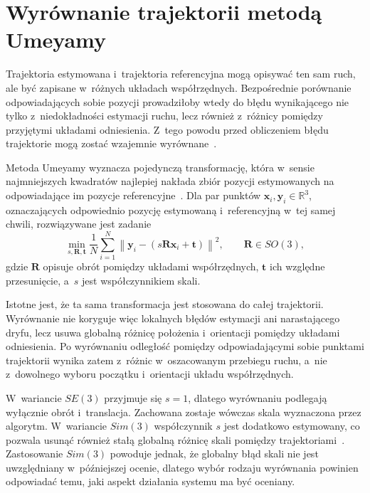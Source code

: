 \section{Wyrównanie trajektorii metodą Umeyamy}
\label{subsec:wyrownanie_umeyamy}

Trajektoria estymowana i~trajektoria referencyjna mogą opisywać ten sam ruch, ale być zapisane w~różnych układach współrzędnych. Bezpośrednie porównanie odpowiadających sobie pozycji prowadziłoby wtedy do błędu wynikającego nie tylko z~niedokładności estymacji ruchu, lecz również z~różnicy pomiędzy przyjętymi układami odniesienia. Z~tego powodu przed obliczeniem błędu trajektorie mogą zostać wzajemnie wyrównane~\cite{sturm2012benchmark}.

Metoda Umeyamy wyznacza pojedynczą transformację, która w~sensie najmniejszych kwadratów najlepiej nakłada zbiór pozycji estymowanych na odpowiadające im pozycje referencyjne~\cite{umeyama1991least}. Dla par punktów $\mathbf{x}_i,\mathbf{y}_i\in\mathbb{R}^3$, oznaczających odpowiednio pozycję estymowaną i~referencyjną w~tej samej chwili, rozwiązywane jest zadanie
\begin{equation}
    \underset{s,\mathbf{R},\mathbf{t}}{\operatorname{min}}
    \frac{1}{N}\sum_{i=1}^{N}
    \left\|
        \mathbf{y}_i-
        \left(
            s\mathbf{R}\mathbf{x}_i+\mathbf{t}
        \right)
    \right\|^2,
    \qquad
    \mathbf{R}\in SO(3),
    \label{eq:umeyama_objective}
\end{equation}
gdzie $\mathbf{R}$ opisuje obrót pomiędzy układami współrzędnych, $\mathbf{t}$ ich względne przesunięcie, a~$s$ jest współczynnikiem skali.

Istotne jest, że ta sama transformacja jest stosowana do całej trajektorii. Wyrównanie nie koryguje więc lokalnych błędów estymacji ani narastającego dryfu, lecz usuwa globalną różnicę położenia i~orientacji pomiędzy układami odniesienia. Po wyrównaniu odległość pomiędzy odpowiadającymi sobie punktami trajektorii wynika zatem z~różnic w~oszacowanym przebiegu ruchu, a~nie z~dowolnego wyboru początku i~orientacji układu współrzędnych.

W~wariancie $SE(3)$ przyjmuje się $s=1$, dlatego wyrównaniu podlegają wyłącznie obrót i~translacja. Zachowana zostaje wówczas skala wyznaczona przez algorytm. W~wariancie $Sim(3)$ współczynnik $s$ jest dodatkowo estymowany, co pozwala usunąć również stałą globalną różnicę skali pomiędzy trajektoriami~\cite{umeyama1991least}. Zastosowanie $Sim(3)$ powoduje jednak, że globalny błąd skali nie jest uwzględniany w~późniejszej ocenie, dlatego wybór rodzaju wyrównania powinien odpowiadać temu, jaki aspekt działania systemu ma być oceniany.
